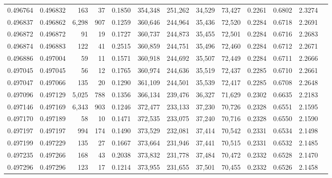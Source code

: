 \begin{tabular}{rrrrrrrrrrrrr}
0.496764 & 0.496832 &   163 &    37 &                                     0.1850 & 354,348 & 251,262 &  34,529 &  73,427 & 0.2261 & 0.6802 & 2.3274 \\
0.496837 & 0.496862 & 6,298 &   907 &                                     0.1259 & 360,646 & 244,964 &  35,436 &  72,520 & 0.2284 & 0.6718 & 2.2691 \\
0.496872 & 0.496872 &    91 &    19 &                                     0.1727 & 360,737 & 244,873 &  35,455 &  72,501 & 0.2284 & 0.6716 & 2.2683 \\
0.496874 & 0.496883 &   122 &    41 &                                     0.2515 & 360,859 & 244,751 &  35,496 &  72,460 & 0.2284 & 0.6712 & 2.2671 \\
0.496886 & 0.497004 &    59 &    11 &                                     0.1571 & 360,918 & 244,692 &  35,507 &  72,449 & 0.2284 & 0.6711 & 2.2666 \\
0.497045 & 0.497045 &    56 &    12 &                                     0.1765 & 360,974 & 244,636 &  35,519 &  72,437 & 0.2285 & 0.6710 & 2.2661 \\
0.497047 & 0.497066 &   135 &    20 &                                     0.1290 & 361,109 & 244,501 &  35,539 &  72,417 & 0.2285 & 0.6708 & 2.2648 \\
0.497096 & 0.497129 & 5,025 &   788 &                                     0.1356 & 366,134 & 239,476 &  36,327 &  71,629 & 0.2302 & 0.6635 & 2.2183 \\
0.497146 & 0.497169 & 6,343 &   903 &                                     0.1246 & 372,477 & 233,133 &  37,230 &  70,726 & 0.2328 & 0.6551 & 2.1595 \\
0.497170 & 0.497189 &    58 &    10 &                                     0.1471 & 372,535 & 233,075 &  37,240 &  70,716 & 0.2328 & 0.6550 & 2.1590 \\
0.497197 & 0.497197 &   994 &   174 &                                     0.1490 & 373,529 & 232,081 &  37,414 &  70,542 & 0.2331 & 0.6534 & 2.1498 \\
0.497199 & 0.497229 &   135 &    27 &                                     0.1667 & 373,664 & 231,946 &  37,441 &  70,515 & 0.2331 & 0.6532 & 2.1485 \\
0.497235 & 0.497266 &   168 &    43 &                                     0.2038 & 373,832 & 231,778 &  37,484 &  70,472 & 0.2332 & 0.6528 & 2.1470 \\
0.497296 & 0.497296 &   123 &    17 &                                     0.1214 & 373,955 & 231,655 &  37,501 &  70,455 & 0.2332 & 0.6526 & 2.1458 \\

\end{tabular}
